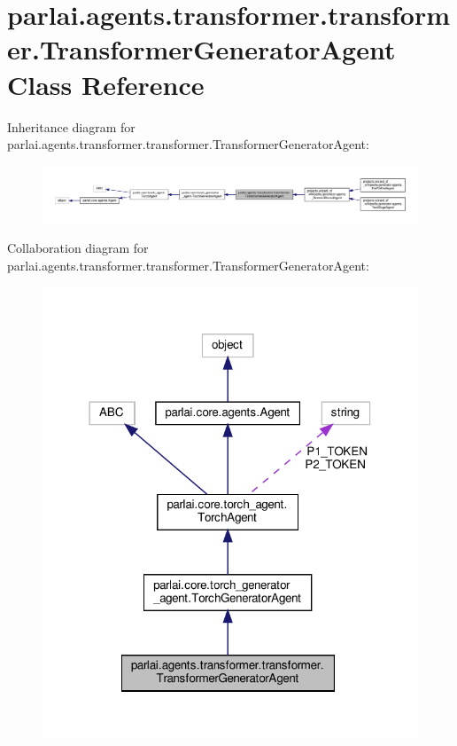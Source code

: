 \hypertarget{classparlai_1_1agents_1_1transformer_1_1transformer_1_1TransformerGeneratorAgent}{}\section{parlai.\+agents.\+transformer.\+transformer.\+Transformer\+Generator\+Agent Class Reference}
\label{classparlai_1_1agents_1_1transformer_1_1transformer_1_1TransformerGeneratorAgent}


Inheritance diagram for parlai.\+agents.\+transformer.\+transformer.\+Transformer\+Generator\+Agent\+:
\nopagebreak
\begin{figure}[H]
\begin{center}
\leavevmode
\includegraphics[width=350pt]{classparlai_1_1agents_1_1transformer_1_1transformer_1_1TransformerGeneratorAgent__inherit__graph}
\end{center}
\end{figure}


Collaboration diagram for parlai.\+agents.\+transformer.\+transformer.\+Transformer\+Generator\+Agent\+:
\nopagebreak
\begin{figure}[H]
\begin{center}
\leavevmode
\includegraphics[width=318pt]{classparlai_1_1agents_1_1transformer_1_1transformer_1_1TransformerGeneratorAgent__coll__graph}
\end{center}
\end{figure}

